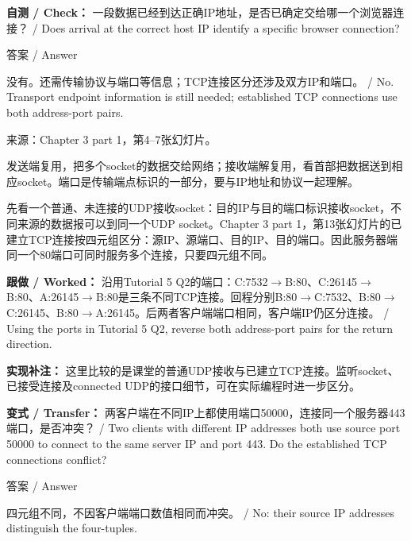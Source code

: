 \textbf{自测 / Check：} 一段数据已经到达正确IP地址，是否已确定交给哪一个浏览器连接？ / Does arrival at the correct host IP identify a specific browser connection?



\begin{StudySolution}{答案 / Answer}


没有。还需传输协议与端口等信息；TCP连接区分还涉及双方IP和端口。 / No. Transport endpoint information is still needed; established TCP connections use both address-port pairs.


\end{StudySolution}


来源：Chapter 3 part 1，第4–7张幻灯片。








发送端复用，把多个socket的数据交给网络；接收端解复用，看首部把数据送到相应socket。端口是传输端点标识的一部分，要与IP地址和协议一起理解。


先看一个普通、未连接的UDP接收socket：目的IP与目的端口标识接收socket，不同来源的数据报可以到同一个UDP socket。Chapter 3 part 1，第13张幻灯片的已建立TCP连接按四元组区分：源IP、源端口、目的IP、目的端口。因此服务器端同一个80端口可同时服务多个连接，只要四元组不同。


\textbf{跟做 / Worked：} 沿用Tutorial 5 Q2的端口：C:7532\ensuremath{\to}B:80、C:26145\ensuremath{\to}B:80、A:26145\ensuremath{\to}B:80是三条不同TCP连接。回程分别B:80\ensuremath{\to}C:7532、B:80\ensuremath{\to}C:26145、B:80\ensuremath{\to}A:26145。后两者客户端端口相同，客户端IP仍区分连接。 / Using the ports in Tutorial 5 Q2, reverse both address-port pairs for the return direction.


\textbf{实现补注：} 这里比较的是课堂的普通UDP接收与已建立TCP连接。监听socket、已接受连接及connected UDP的接口细节，可在实际编程时进一步区分。


\textbf{变式 / Transfer：} 两客户端在不同IP上都使用端口50000，连接同一个服务器443端口，是否冲突？ / Two clients with different IP addresses both use source port 50000 to connect to the same server IP and port 443. Do the established TCP connections conflict?



\begin{StudySolution}{答案 / Answer}


四元组不同，不因客户端端口数值相同而冲突。 / No: their source IP addresses distinguish the four-tuples.


\end{StudySolution}


